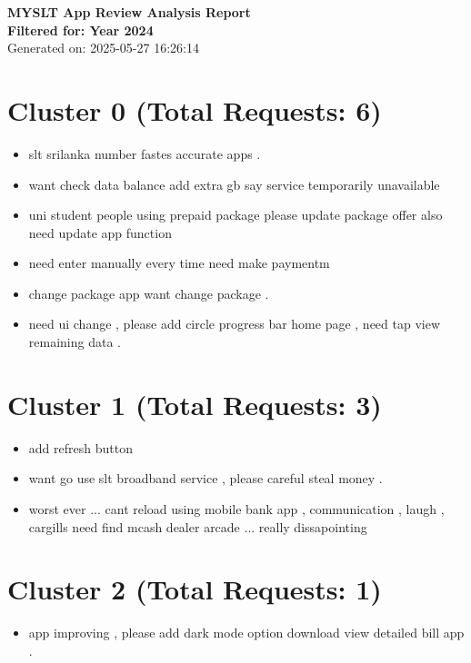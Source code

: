 \documentclass[a4paper,12pt]{article}
\begin{document}
\begin{center}
    \textbf{\Large MYSLT App Review Analysis Report} \\
    \vspace{0.5cm}
    \textbf{Filtered for: Year 2024} \\
    \vspace{0.5cm}
    Generated on: 2025-05-27 16:26:14
\end{center}

\vspace{1cm}

\section*{Cluster 0 (Total Requests: 6)}
\begin{itemize}[leftmargin=*]
\item slt srilanka number fastes accurate apps .
\item want check data balance add extra gb say service temporarily unavailable
\item uni student people using prepaid package please update package offer also need update app function
\item need enter manually every time need make paymentm
\item change package app want change package .
\item need ui change , please add circle progress bar home page , need tap view remaining data .
\end{itemize}
\vspace{0.5cm}
\section*{Cluster 1 (Total Requests: 3)}
\begin{itemize}[leftmargin=*]
\item add refresh button
\item want go use slt broadband service , please careful steal money .
\item worst ever ... cant reload using mobile bank app , communication , laugh , cargills need find mcash dealer arcade ... really dissapointing
\end{itemize}
\vspace{0.5cm}
\section*{Cluster 2 (Total Requests: 1)}
\begin{itemize}[leftmargin=*]
\item app improving , please add dark mode option download view detailed bill app .
\end{itemize}
\vspace{0.5cm}
\end{document}
